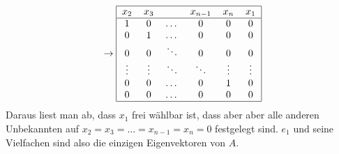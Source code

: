 \begin{loesung}
\[\begin{tabular}{|cccccc|}
\hline
\end{tabular}
\rightarrow
\begin{tabular}{|cccccc|}
\hline
$x_2$&$x_3$&&$x_{n-1}$&$x_n$&$x_1$\\
\hline
1       &0       &$ \dots$&0       &0       &0        \\
0       &1       &$ \dots$&0       &0       &0        \\
0       &0       &$\ddots$&0       &0       &0        \\
$\vdots$&$\vdots$&$\ddots$&$\ddots$&$\vdots$&$\vdots$ \\
0       &0       &$ \dots$&0       &1       &0        \\
0       &0       &$ \dots$&0       &0       &0        \\
\hline
\end{tabular}
\]
Daraus liest man ab, dass $x_1$ frei wählbar ist, dass aber
aber alle anderen Unbekannten auf $x_2=x_3=\dots=x_{n-1}=x_n=0$
festgelegt sind. $e_1$ und seine Vielfachen sind also die einzigen
Eigenvektoren von $A$.
\end{loesung}

